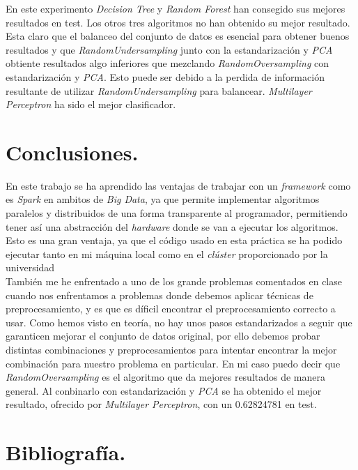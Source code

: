 \documentclass[11pt]{article}
\begin{document}
En este experimento \textit{Decision Tree} y \textit{Random Forest} han consegido sus mejores resultados en test. Los otros tres algoritmos no han obtenido su mejor resultado. Esta claro que el balanceo del conjunto de datos es esencial para obtener buenos resultados y que \textit{RandomUndersampling} junto con la estandarización y \textit{PCA} obtiente resultados algo inferiores que mezclando \textit{RandomOversampling} con estandarización y \textit{PCA}. Esto puede ser debido a la perdida de información resultante de utilizar \textit{RandomUndersampling} para balancear. \textit{Multilayer Perceptron} ha sido el mejor clasificador.

\section{Conclusiones.}

En este trabajo se ha aprendido las ventajas de trabajar con un \textit{framework} como es \textit{Spark} en ambitos de \textit{Big Data}, ya que permite implementar algoritmos paralelos y distribuidos de una forma transparente al programador, permitiendo tener así una abstracción del \textit{hardware} donde se van a ejecutar los algoritmos. Esto es una gran ventaja, ya que el código usado en esta práctica se ha podido ejecutar tanto en mi máquina local como en el \textit{clúster} proporcionado por la universidad \\

También me he enfrentado a uno de los grande problemas comentados en clase cuando nos enfrentamos a problemas donde debemos aplicar técnicas de preprocesamiento, y es que es díficil encontrar el preprocesamiento correcto a usar. Como hemos visto en teoría, no hay unos pasos estandarizados a seguir que garanticen mejorar el conjunto de datos original, por ello debemos probar distintas combinaciones y preprocesamientos para intentar encontrar la mejor combinación para nuestro problema en particular. En mi caso puedo decir que \textit{RandomOversampling} es el algoritmo que da mejores resultados de manera general. Al conbinarlo con estandarización y \textit{PCA} se ha obtenido el mejor resultado, ofrecido por \textit{Multilayer Perceptron}, con un 0.62824781 en test.



\section{Bibliografía.}
\end{document}

